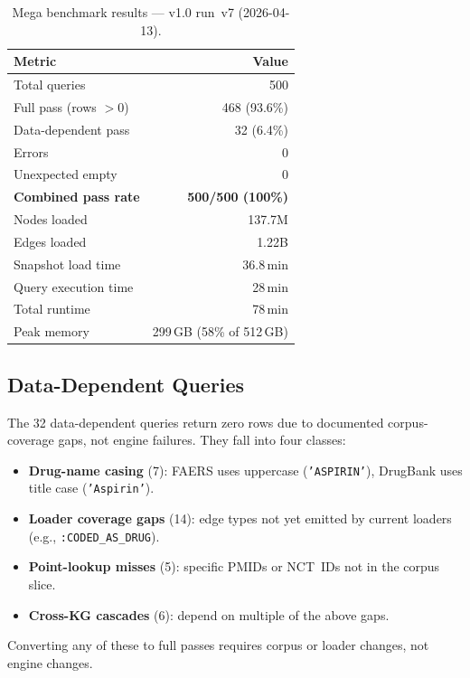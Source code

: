 \documentclass[runningheads]{llncs}
\begin{document}
\begin{table}[t]
\centering
\caption{Mega benchmark results — v1.0 run~v7 (2026-04-13).}
\label{tab:results}
\small
\begin{tabular}{@{}lr@{}}
\toprule
\textbf{Metric} & \textbf{Value} \\
\midrule
Total queries         & 500 \\
Full pass (rows $> 0$) & 468 (93.6\%) \\
Data-dependent pass   &  32 (6.4\%) \\
Errors                &   0 \\
Unexpected empty      &   0 \\
\midrule
\textbf{Combined pass rate} & \textbf{500/500 (100\%)} \\
\midrule
Nodes loaded          & 137.7M \\
Edges loaded          & 1.22B \\
Snapshot load time    & 36.8\,min \\
Query execution time  & 28\,min \\
Total runtime         & 78\,min \\
Peak memory           & 299\,GB (58\% of 512\,GB) \\
\bottomrule
\end{tabular}
\end{table}

\subsection{Data-Dependent Queries}\label{sec:data-dep}

The 32 data-dependent queries return zero rows due to documented
corpus-coverage gaps, not engine failures.  They fall into four
classes:
\begin{itemize}
\item \textbf{Drug-name casing} (7): FAERS uses uppercase
  (\texttt{'ASPIRIN'}), DrugBank uses title case
  (\texttt{'Aspirin'}).
\item \textbf{Loader coverage gaps} (14): edge types not yet
  emitted by current loaders (e.g., \texttt{:CODED\_AS\_DRUG}).
\item \textbf{Point-lookup misses} (5): specific PMIDs or NCT~IDs
  not in the corpus slice.
\item \textbf{Cross-KG cascades} (6): depend on multiple of the
  above gaps.
\end{itemize}
Converting any of these to full passes requires corpus or loader
changes, not engine changes.
\end{document}
